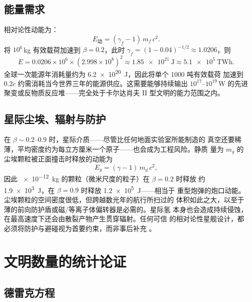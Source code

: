 \documentclass[12pt,a4paper]{article}
\begin{document}
\subsection{能量需求}

相对论性动能为：
\begin{equation}
  E_{\mathrm{动}} = (\gamma_f - 1)\,m_f\,c^2.
\end{equation}
将 $10^6$\,kg 有效载荷加速到 $\beta=0.2$，此时
$\gamma_f = (1-0.04)^{-1/2} \approx 1.0206$，则
\begin{equation*}
  E = 0.0206 \times 10^6 \times (2.998\times10^{8})^2
    \approx \SI{1.85e21}{\joule} \approx \SI{5.1e5}{\tera\watt\hour}.
\end{equation*}
全球一次能源年消耗量约为 \SI{6.2e20}{\joule}，因此将单个 1000 吨有效载荷
加速到 $0.2c$ 约需消耗当今世界三年的能源供应。这需要能够持续输出
$10^{17}$--$10^{19}$\,W 的先进聚变或反物质反应堆——完全处于卡尔达肖夫
II 型文明的能力范围之内。

\subsection{星际尘埃、辐射与防护}

在 $\beta \sim 0.2$--$0.9$ 时，星际介质——尽管比任何地面实验室所能制造的
真空还要稀薄，平均密度约为每立方厘米一个原子——也会成为工程风险。静质
量为 $m_g$ 的尘埃颗粒被正面撞击时释放的动能为
\begin{equation}
  E_g = (\gamma - 1)\,m_g\,c^2,
  \label{eq:dust_impact_zh}
\end{equation}
因此 \SI{e-12}{\kilo\gram} 的颗粒（微米尺度的粒子）在 $\beta = 0.2$ 时释放
约 \SI{1.9e3}{\joule}，在 $\beta = 0.9$ 时释放 \SI{1.2e5}{\joule}——相当于
重型炮弹的炮口动能。尘埃颗粒的空间密度很低，但跨越数光年的航行所扫过的
体积如此之大，以至于薄的前向防护盾或磁/等离子体偏转器是必需的。星际氢
本身也会造成持续侵蚀，在最高速度下还会由散裂产物产生贯穿辐射。任何可信
的相对论性星舰设计，都必须将防护与避碰视为首要约束，而非事后补充
\citep{Dyson1968}。

\section{文明数量的统计论证}

\subsection{德雷克方程}
\end{document}
